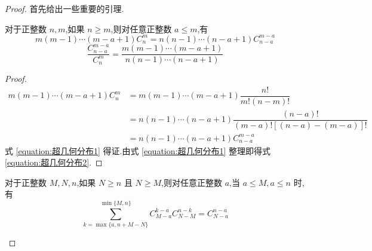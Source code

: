 \begin{proof}
    首先给出一些重要的引理.

    \vspace{0.5em}

    \begin{lemma} \label{lemma:超几何分布1}
        \indent 对于正整数 $n,m$,如果 $n \geqslant m$,则对任意正整数 $a \leqslant m$,有
        \begin{equation} \label{equation:超几何分布1}
            m(m-1) \cdots (m-a+1) C_n^m = n(n-1) \cdots (n-a+1) C_{n-a}^{m-a}
        \end{equation}
        \begin{equation} \label{equation:超几何分布2}
            \dfrac{C_{n-a}^{m-a}}{C_n^m} = \dfrac{m(m-1) \cdots (m-a+1)}{n(n-1) \cdots (n-a+1)}
        \end{equation}
    \end{lemma}

    \vspace{-1em}

    \begin{proof}
        $$
        \begin{aligned}
            m(m-1) \cdots (m-a+1) C_n^m &= m(m-1) \cdots (m-a+1) \dfrac{n!}{m! (n-m)!} \\
            &= n(n-1) \cdots (n-a+1) \dfrac{(n-a)!}{(m-a)! [(n-a) - (m-a)]!} \\
            &= n(n-1) \cdots (n-a+1) C_{n-a}^{m-a}
        \end{aligned}
        $$
        式 \eqref{equation:超几何分布1} 得证.由式 \eqref{equation:超几何分布1} 整理即得式 \eqref{equation:超几何分布2}.
    \end{proof}

    \begin{lemma} \label{lemma:超几何分布2}
        \indent 对于正整数 $M,N,n$,如果 $N \geqslant n$ 且 $N \geqslant M$,则对任意正整数 $a$,当 $a \leqslant M, a \leqslant n$ 时,有
        \begin{equation} \label{equation:超几何分布3}
            \sum_{k=\max\{ a, n+M-N \}}^{\min\{ M,n \}} C_{M-a}^{k-a} C_{N-M}^{n-k} = C_{N-a}^{n-a}
        \end{equation}
    \end{lemma}


\end{proof}
